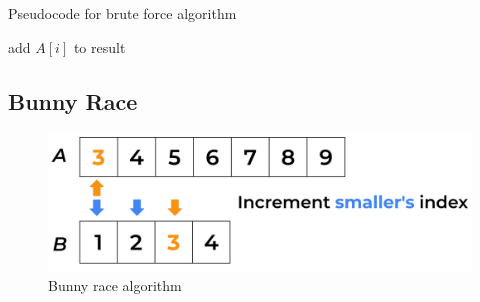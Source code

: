 \begin{algorithm}
    \captionsetup{labelsep=newline}
    \caption{Pseudocode for brute force algorithm \label{alg:bruteforce}}
    \begin{algorithmic}[1]
                    \State add $A[i]$ to result
                \EndIf
            \EndFor
        \EndFor
    \end{algorithmic}
\end{algorithm}

\subsection{Bunny Race}

\begin{figure}[H] 
    \begin{center}
        \includegraphics[width=.8\textwidth]{imgs/bunny_search.png}
        \caption{Bunny race algorithm \label{fig:bunnyrace}}
    \end{center}
\end{figure}

